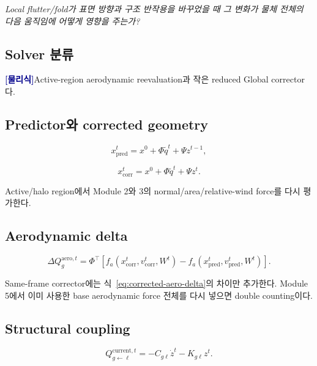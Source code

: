 \documentclass[11pt,a4paper]{article}
\newcommand{\physics}{\textcolor{darkblue}{\textbf{[물리식]}}}
\begin{document}
\emph{Local flutter/fold가 표면 방향과 구조 반작용을 바꾸었을 때
그 변화가 물체 전체의 다음 움직임에 어떻게 영향을 주는가?}

\subsection*{Solver 분류}

\physics Active-region aerodynamic reevaluation과 작은 reduced Global corrector다.

\subsection*{Predictor와 corrected geometry}

\begin{equation}
  x_{\mathrm{pred}}^t
  =
  x^0+\Phi\widetilde q^t+\Psi z^{t-1},
\end{equation}

\begin{equation}
  x_{\mathrm{corr}}^t
  =
  x^0+\Phi\widetilde q^t+\Psi z^t.
\end{equation}

Active/halo region에서 Module 2와 3의 normal/area/relative-wind force를 다시 평가한다.

\subsection*{Aerodynamic delta}

\begin{equation}
  \Delta Q_g^{\mathrm{aero},t}
  =
  \Phi^\top
  \left[
    f_a(x_{\mathrm{corr}}^t,v_{\mathrm{corr}}^t,W^t)
    -
    f_a(x_{\mathrm{pred}}^t,v_{\mathrm{pred}}^t,W^t)
  \right].
  \label{eq:corrected-aero-delta}
\end{equation}

Same-frame corrector에는 식~\eqref{eq:corrected-aero-delta}의 차이만 추가한다.
Module 5에서 이미 사용한 base aerodynamic force 전체를 다시 넣으면 double counting이다.

\subsection*{Structural coupling}

\begin{equation}
  Q_{g\leftarrow\ell}^{\mathrm{current},t}
  =
  -C_{g\ell}\dot z^t
  -K_{g\ell}z^t.
  \label{eq:structural-feedback}
\end{equation}
\end{document}
